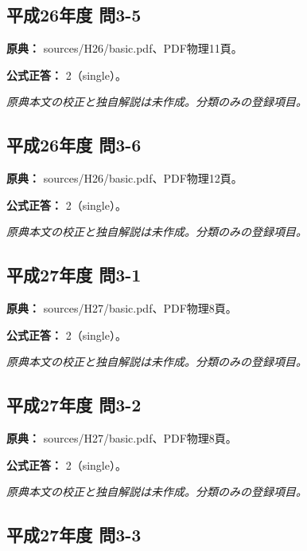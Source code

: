 \subsection{平成26年度 問3-5}
\label{q:h26-reg-basic-3-5}

\noindent\textbf{原典：} sources/H26/basic.pdf、PDF物理11頁。

\textbf{公式正答：} 2（single）。

\par\textit{原典本文の校正と独自解説は未作成。分類のみの登録項目。}

\subsection{平成26年度 問3-6}
\label{q:h26-reg-basic-3-6}

\noindent\textbf{原典：} sources/H26/basic.pdf、PDF物理12頁。

\textbf{公式正答：} 2（single）。

\par\textit{原典本文の校正と独自解説は未作成。分類のみの登録項目。}

\subsection{平成27年度 問3-1}
\label{q:h27-reg-basic-3-1}

\noindent\textbf{原典：} sources/H27/basic.pdf、PDF物理8頁。

\textbf{公式正答：} 2（single）。

\par\textit{原典本文の校正と独自解説は未作成。分類のみの登録項目。}

\subsection{平成27年度 問3-2}
\label{q:h27-reg-basic-3-2}

\noindent\textbf{原典：} sources/H27/basic.pdf、PDF物理8頁。

\textbf{公式正答：} 2（single）。

\par\textit{原典本文の校正と独自解説は未作成。分類のみの登録項目。}

\subsection{平成27年度 問3-3}
\label{q:h27-reg-basic-3-3}

